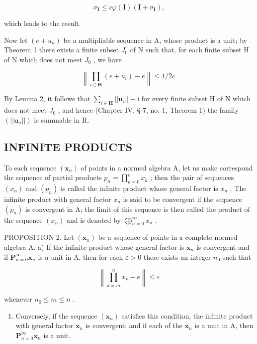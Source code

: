 \[
\sigma_ {\mathbf {I}} \leqslant c \varphi (\mathbf {I}) (\mathbf {I} + \sigma_ {\mathbf {I}}),
\]

which leads to the result.

Now let \((e + u_{n})\) be a multipliable sequence in A, whose product is a unit; by Theorem 1 there exists a finite subset \(J_{0}\) of N such that, for each finite subset H of N which does not meet \(J_{0}\) , we have

\[
\left\| \prod_ {i \in \mathbf {H}} (e + u _ {i}) - e \right\| \leqslant 1 / 2 c.
\]

By Lemma 2, it follows that \(\sum_{i\in\mathbf{H}}||\boldsymbol{u}_{i}||-\mathrm{i}\) for every finite subset H of N which does not meet \(J_{0}\) , and hence (Chapter IV, § 7, no. 1, Theorem 1) the family \((||\boldsymbol{u}_{n}||)\) is summable in R.

\subsection{INFINITE PRODUCTS}

To each sequence \((\pmb{x}_n)\) of points in a normed algebra A, let us make correspond the sequence of partial products \(p_n = \prod_{k=0}^{n} x_k\) ; then the pair of sequences \((x_{n})\) and \((p_{n})\) is called the infinite product whose general factor is \(x_{n}\) . The infinite product with general factor \(x_{n}\) is said to be convergent if the sequence \((p_{n})\) is convergent in A; the limit of this sequence is then called the product of the sequence \((x_{n})\) and is denoted by \(\bigoplus_{n=0}^{\infty} x_{n}\) .

PROPOSITION 2. Let \((\pmb{x}_n)\) be a sequence of points in a complete normed algebra A. a) If the infinite product whose general factor is \(\pmb{x}_n\) is convergent and if \(\mathbf{P}_{n=0}^{\infty}\pmb{x}_n\) is a unit in A, then for each \(\varepsilon > 0\) there exists an integer \(n_0\) such that

\[
\left\| \prod_ {k = m} ^ {n} x _ {k} - e \right\| \leqslant \varepsilon
\]

whenever \(n_0 \leqslant m \leqslant n\) .

\begin{enumerate}
\def\labelenumi{\alph{enumi})}
\setcounter{enumi}{1}
\tightlist
\item
  Conversely, if the sequence \((\pmb{x}_n)\) satisfies this condition, the infinite product with general factor \(\pmb{x}_n\) is convergent; and if each of the \(\pmb{x}_n\) is a unit in A, then \(\mathbf{P}_{n=0}^{\infty}\pmb{x}_n\) is a unit.
\end{enumerate}

